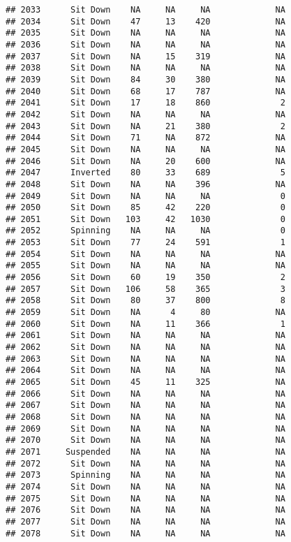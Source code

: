 \documentclass[
]{article}
\begin{document}
\begin{verbatim}
## 2033      Sit Down    NA     NA     NA             NA
## 2034      Sit Down    47     13    420             NA
## 2035      Sit Down    NA     NA     NA             NA
## 2036      Sit Down    NA     NA     NA             NA
## 2037      Sit Down    NA     15    319             NA
## 2038      Sit Down    NA     NA     NA             NA
## 2039      Sit Down    84     30    380             NA
## 2040      Sit Down    68     17    787             NA
## 2041      Sit Down    17     18    860              2
## 2042      Sit Down    NA     NA     NA             NA
## 2043      Sit Down    NA     21    380              2
## 2044      Sit Down    71     NA    872             NA
## 2045      Sit Down    NA     NA     NA             NA
## 2046      Sit Down    NA     20    600             NA
## 2047      Inverted    80     33    689              5
## 2048      Sit Down    NA     NA    396             NA
## 2049      Sit Down    NA     NA     NA              0
## 2050      Sit Down    85     42    220              0
## 2051      Sit Down   103     42   1030              0
## 2052      Spinning    NA     NA     NA              0
## 2053      Sit Down    77     24    591              1
## 2054      Sit Down    NA     NA     NA             NA
## 2055      Sit Down    NA     NA     NA             NA
## 2056      Sit Down    60     19    350              2
## 2057      Sit Down   106     58    365              3
## 2058      Sit Down    80     37    800              8
## 2059      Sit Down    NA      4     80             NA
## 2060      Sit Down    NA     11    366              1
## 2061      Sit Down    NA     NA     NA             NA
## 2062      Sit Down    NA     NA     NA             NA
## 2063      Sit Down    NA     NA     NA             NA
## 2064      Sit Down    NA     NA     NA             NA
## 2065      Sit Down    45     11    325             NA
## 2066      Sit Down    NA     NA     NA             NA
## 2067      Sit Down    NA     NA     NA             NA
## 2068      Sit Down    NA     NA     NA             NA
## 2069      Sit Down    NA     NA     NA             NA
## 2070      Sit Down    NA     NA     NA             NA
## 2071     Suspended    NA     NA     NA             NA
## 2072      Sit Down    NA     NA     NA             NA
## 2073      Spinning    NA     NA     NA             NA
## 2074      Sit Down    NA     NA     NA             NA
## 2075      Sit Down    NA     NA     NA             NA
## 2076      Sit Down    NA     NA     NA             NA
## 2077      Sit Down    NA     NA     NA             NA
## 2078      Sit Down    NA     NA     NA             NA

\end{verbatim}
\end{document}

